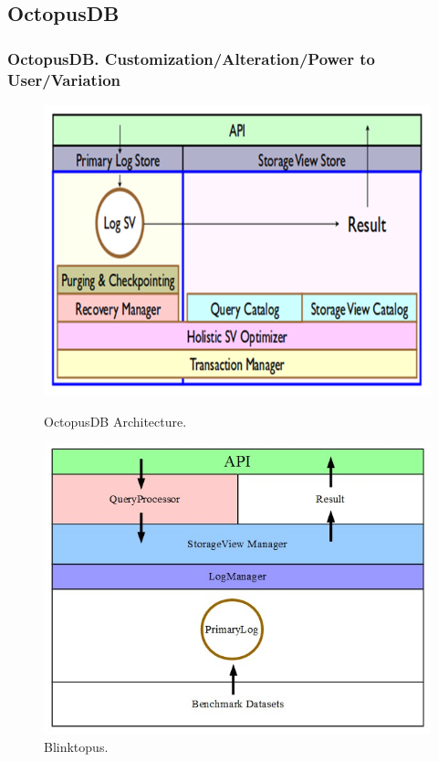 \documentclass{beamer}
\begin{document}
\subsection{OctopusDB}
\begin{frame}
\frametitle{OctopusDB. Customization/Alteration/Power to User/Variation}
\begin{figure}
\centering
\begin{minipage}{.5\textwidth}
  \centering
  \includegraphics[scale=0.25]{img/octopus_arch.png}
  \caption{OctopusDB Architecture.}
\end{minipage}%
\pause
\begin{minipage}{.5\textwidth}
  \centering
  \includegraphics[scale=0.25]{img/Blinktopus-OctopusPart.jpg}
	\caption{Blinktopus.}
\end{minipage}
\end{figure}
\end{frame}
\end{document}
